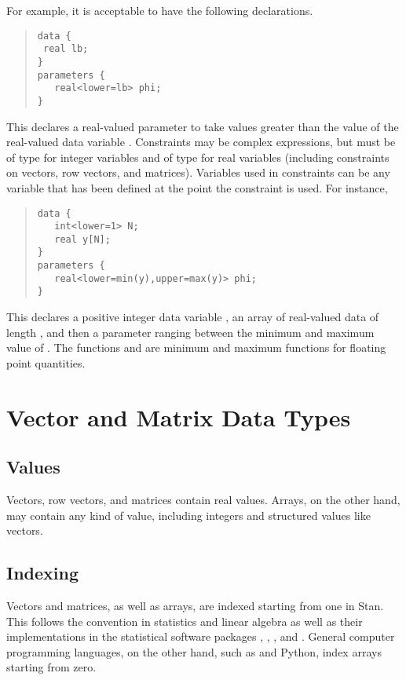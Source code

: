 For example, it is acceptable to have the
following declarations.
%
\begin{quote}
\begin{Verbatim}
data { 
 real lb;
}
parameters {
   real<lower=lb> phi;
}
\end{Verbatim}
\end{quote}
%
This declares a real-valued parameter  to take values
greater than the value of the real-valued data variable .
Constraints may be complex expressions, but must be of type 
for integer variables and of type  for real variables
(including constraints on vectors, row vectors, and matrices).
Variables used in constraints can be any variable that has been
defined at the point the constraint is used.  For instance,
\begin{quote}
\begin{Verbatim}
data { 
   int<lower=1> N;
   real y[N];
}
parameters {
   real<lower=min(y),upper=max(y)> phi;
}
\end{Verbatim}
\end{quote}
%
This declares a positive integer data variable , an array
 of real-valued data of length , and then a parameter
ranging between the minimum and maximum value of .  The
functions  and  are minimum and maximum
functions for floating point quantities.


\section{Vector and Matrix Data Types}

\subsection{Values}

Vectors, row vectors, and matrices contain real values.  Arrays, on
the other hand, may contain any kind of value, including integers and
structured values like vectors.

\subsection{Indexing}

Vectors and matrices, as well as arrays, are indexed starting from one
in Stan.  This follows the convention in statistics and linear
algebra as well as their implementations in the statistical software
packages \R, \MATLAB, \BUGS, and \JAGS.  General computer programming
languages, on the other hand, such as \Cpp and Python, index arrays
starting from zero.


